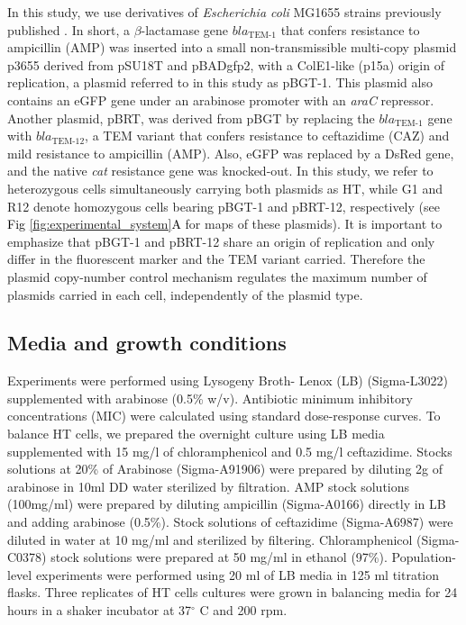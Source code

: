 \documentclass[fleqn,12pt]{wlscirep}
\newcommand{\fig}[1]{\textcolor{black}{#1}}
\begin{document}
In this study, we use derivatives of \textit{Escherichia coli} MG1655 strains previously published \cite{san2016multicopy,Rodriguez2018}. In short, a $\beta$-lactamase gene $bla_{\text{TEM-1}}$ that confers resistance to ampicillin (AMP) was inserted into a small non-transmissible multi-copy plasmid p3655 derived from pSU18T and pBADgfp2, with a ColE1-like (p15a) origin of replication\cite{le2007construction}, a plasmid referred to in this study as pBGT-1.  This plasmid also contains an eGFP gene under an arabinose promoter with an {\em araC} repressor. Another plasmid, pBRT,  was derived from pBGT by replacing the $bla_{\text{TEM-1}}$ gene with $bla_{\text{TEM-12}}$, a TEM variant that confers resistance to ceftazidime (CAZ) and mild resistance to ampicillin (AMP). Also, eGFP was replaced by a DsRed gene, and the native {\em cat} resistance gene was knocked-out. In this study, we refer to heterozygous cells simultaneously carrying both plasmids as HT, while G1 and R12 denote homozygous cells bearing pBGT-1 and pBRT-12, respectively (see \fig{Fig \ref{fig:experimental_system}A} for maps of these plasmids). It is important to emphasize that pBGT-1 and pBRT-12 share an origin of replication and only differ in the fluorescent marker and the TEM variant carried. Therefore the plasmid copy-number control mechanism regulates the maximum number of plasmids carried in each cell, independently of the plasmid type.

\subsection{Media and growth conditions}

Experiments were performed using Lysogeny Broth- Lenox (LB) (Sigma-L3022) supplemented with arabinose (0.5\% w/v). 
Antibiotic minimum inhibitory concentrations (MIC) were calculated using standard dose-response curves. 
To balance HT cells, we prepared the overnight culture using LB media supplemented with 15 mg/l of chloramphenicol and 0.5 mg/l ceftazidime. 
Stocks solutions at 20\% of Arabinose (Sigma-A91906) were prepared by diluting 2g of arabinose in 10ml DD water sterilized by filtration. 
AMP stock solutions (100mg/ml) were prepared by diluting ampicillin (Sigma-A0166) directly in LB and adding arabinose (0.5\%). Stock solutions of ceftazidime (Sigma-A6987) were diluted in water at 10 mg/ml and sterilized by filtering. Chloramphenicol (Sigma-C0378) stock solutions were prepared at 50 mg/ml in ethanol (97\%).   
Population-level experiments were performed using 20 ml of LB media in 125 ml titration flasks. Three replicates of HT cells cultures were grown in balancing media for 24 hours in a shaker incubator at 37$^{\circ}$ C and 200 rpm. 
\end{document}

